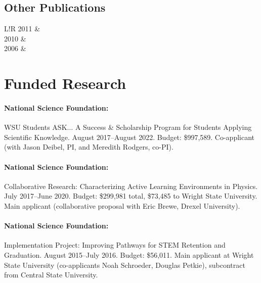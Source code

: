 \documentclass[10pt]{article}
\newcommand\VRule{\color{lightgray}\vrule width 0.5pt}
\begin{document}
\subsection*{Other Publications}
\begin{tabular}{L!{\VRule}R}
2011	& \\[5pt]
2010 	& \\[5pt]
2006 	& \\%
\end{tabular}
 
\section*{Funded Research}

\paragraph{National Science Foundation:} WSU Students ASK$\ldots$ A Success \& Scholarship Program for Students Applying Scientific Knowledge. August 2017--August 2022. Budget: \$997,589. Co-applicant (with Jason Deibel, PI, and Meredith Rodgers, co-PI).

\paragraph{National Science Foundation:} Collaborative Research: Characterizing Active Learning Environments in Physics. July 2017--June 2020. Budget: \$299,981 total, \$73,485 to Wright State University. Main applicant (collaborative proposal with Eric Brewe, Drexel University).

\paragraph{National Science Foundation:} Implementation Project: Improving Pathways for STEM Retention and Graduation. August 2015--July 2016. Budget: \$56,011. Main applicant at Wright State University (co-applicants Noah Schroeder, Douglas Petkie), subcontract from Central State University.

 
\newpage
 
\end{document}
